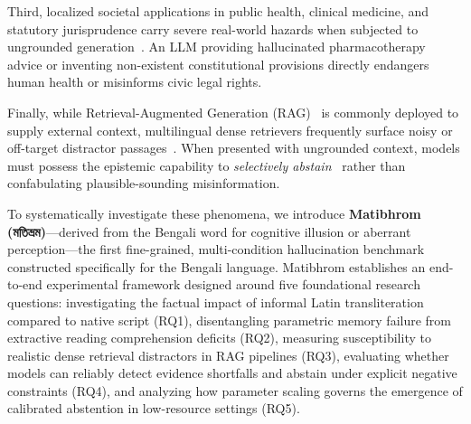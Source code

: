 \documentclass[11pt,a4paper,twocolumn]{article}
\DeclareRobustCommand{\foreignlanguage}[2]{#2}
\let\bengalifont\relax
\DeclareRobustCommand{\foreignlanguage}[2]{{\bengalifont #2}}
\DeclareRobustCommand{\foreignlanguage}[2]{#2}
\begin{document}
Third, localized societal applications in public health, clinical medicine, and statutory jurisprudence carry severe real-world hazards when subjected to ungrounded generation~\citep{pal2023medhalt,guha2023legalbench}. An LLM providing hallucinated pharmacotherapy advice or inventing non-existent constitutional provisions directly endangers human health or misinforms civic legal rights.

Finally, while Retrieval-Augmented Generation (RAG)~\citep{lewis2020rag} is commonly deployed to supply external context, multilingual dense retrievers frequently surface noisy or off-target distractor passages~\citep{cuconasu2024power,park2024robust}. When presented with ungrounded context, models must possess the epistemic capability to \emph{selectively abstain}~\citep{cole2023selectively,yin2023large} rather than confabulating plausible-sounding misinformation.

To systematically investigate these phenomena, we introduce \textbf{Matibhrom (\foreignlanguage{bengali}{মতিভ্রম})}---derived from the Bengali word for cognitive illusion or aberrant perception---the first fine-grained, multi-condition hallucination benchmark constructed specifically for the Bengali language. Matibhrom establishes an end-to-end experimental framework designed around five foundational research questions: investigating the factual impact of informal Latin transliteration compared to native script (RQ1), disentangling parametric memory failure from extractive reading comprehension deficits (RQ2), measuring susceptibility to realistic dense retrieval distractors in RAG pipelines (RQ3), evaluating whether models can reliably detect evidence shortfalls and abstain under explicit negative constraints (RQ4), and analyzing how parameter scaling governs the emergence of calibrated abstention in low-resource settings (RQ5).
\end{document}

